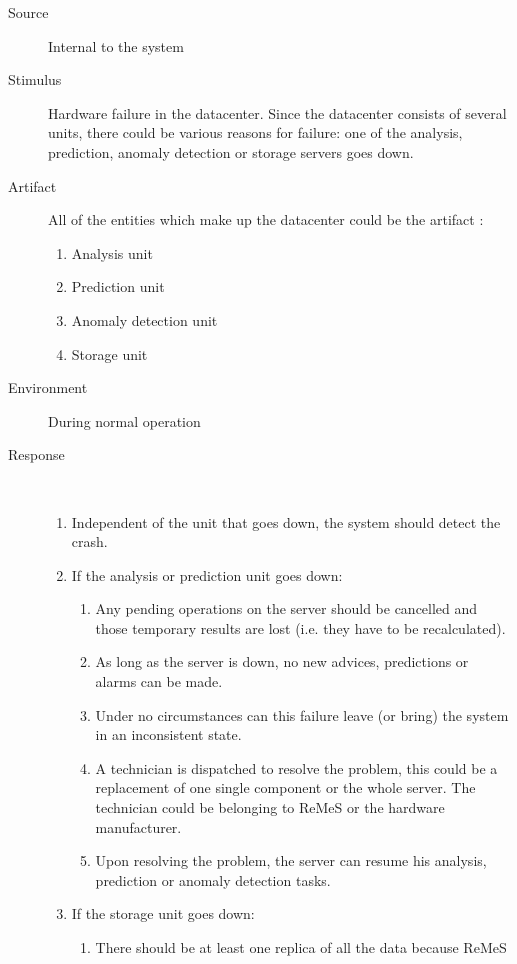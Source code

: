 \begin{description}
	\item[Source] Internal to the system
	\item[Stimulus] Hardware failure in the datacenter. Since the datacenter
	consists of several units, there could be various reasons for failure: one of
	the analysis, prediction, anomaly detection or storage servers goes down.
	\item[Artifact] All of the entities which make up the datacenter could be the
	artifact :
	\begin{enumerate}
	  \item Analysis unit
	  \item Prediction unit
	  \item Anomaly detection unit
	  \item Storage unit
	\end{enumerate}
	\item[Environment] During normal operation
	\item[Response] \
	\begin{enumerate}
	  \item Independent of the unit that goes down, the system should detect the
	  crash.
	  \item If the analysis or prediction unit goes down:
	  \begin{enumerate}
	    \item Any pending operations on the server should be cancelled and those
	    temporary results are lost (i.e. they have to be recalculated).
	    \item As long as the server is down, no new advices, predictions or alarms
	    can be made.
	    \item Under no circumstances can this failure leave (or bring) the system
	    in an inconsistent state.
	    \item A technician is dispatched to resolve the problem, this could be a
	    replacement of one single component or the whole server. The technician
	    could be belonging to ReMeS or the hardware manufacturer.
	    \item Upon resolving the problem, the server can resume his analysis,
	    prediction or anomaly detection tasks.
	  \end{enumerate}
	  \item If the storage unit goes down:
	  \begin{enumerate}
	   \item There should be at least one replica of all the data because ReMeS

\end{enumerate}
\end{enumerate}
\end{description}
